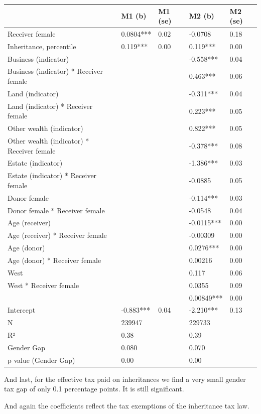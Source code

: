 \documentclass[
  letterpaper,
  DIV=11,
  numbers=noendperiod]{scrartcl}
\begin{document}
\begin{longtable}[]{@{}lllll@{}}
\toprule()
& M1 (b) & M1 (se) & M2 (b) & M2 (se) \\
\midrule()
\endhead
Receiver female & 0.0804*** & 0.02 & -0.0708 & 0.18 \\
Inheritance, percentile & 0.119*** & 0.00 & 0.119*** & 0.00 \\
Business (indicator) & & & -0.558*** & 0.04 \\
Business (indicator) * Receiver female & & & 0.463*** & 0.06 \\
Land (indicator) & & & -0.311*** & 0.04 \\
Land (indicator) * Receiver female & & & 0.223*** & 0.05 \\
Other wealth (indicator) & & & 0.822*** & 0.05 \\
Other wealth (indicator) * Receiver female & & & -0.378*** & 0.08 \\
Estate (indicator) & & & -1.386*** & 0.03 \\
Estate (indicator) * Receiver female & & & -0.0885 & 0.05 \\
Donor female & & & -0.114*** & 0.03 \\
Donor female * Receiver female & & & -0.0548 & 0.04 \\
Age (receiver) & & & -0.0115*** & 0.00 \\
Age (receiver) * Receiver female & & & -0.00309 & 0.00 \\
Age (donor) & & & 0.0276*** & 0.00 \\
Age (donor) * Receiver female & & & 0.00216 & 0.00 \\
West & & & 0.117 & 0.06 \\
West * Receiver female & & & 0.0355 & 0.09 \\
& & & 0.00849*** & 0.00 \\
Intercept & -0.883*** & 0.04 & -2.210*** & 0.13 \\
N & 239947 & & 229733 & \\
R² & 0.38 & & 0.39 & \\
Gender Gap & 0.080 & & 0.070 & \\
p value (Gender Gap) & 0.00 & & 0.00 & \\
\bottomrule()
\end{longtable}

And last, for the effective tax paid on inheritances we find a very
small gender tax gap of only 0.1 percentage points. It is still
significant.

And again the coefficients reflect the tax exemptions of the inheritance
tax law.
\end{document}
